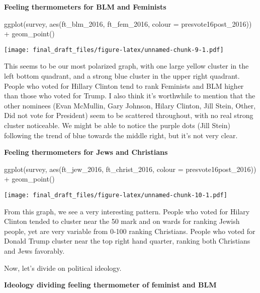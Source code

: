 \documentclass[
]{article}
\newenvironment{Shaded}{\begin{snugshade}}{\end{snugshade}}
\newcommand{\AttributeTok}[1]{\textcolor[rgb]{0.77,0.63,0.00}{#1}}
\newcommand{\FunctionTok}[1]{\textcolor[rgb]{0.00,0.00,0.00}{#1}}
\newcommand{\NormalTok}[1]{#1}
\newcommand{\SpecialCharTok}[1]{\textcolor[rgb]{0.00,0.00,0.00}{#1}}
\begin{document}
\textbf{Feeling thermometers for BLM and Feminists}

\begin{Shaded}
\begin{Highlighting}[]
\FunctionTok{ggplot}\NormalTok{(survey, }\FunctionTok{aes}\NormalTok{(ft\_blm\_2016, ft\_fem\_2016, }\AttributeTok{colour =}\NormalTok{ presvote16post\_2016)) }\SpecialCharTok{+} 
  \FunctionTok{geom\_point}\NormalTok{()}
\end{Highlighting}
\end{Shaded}

\texttt{[image: final\_draft\_files/figure-latex/unnamed-chunk-9-1.pdf]}

This seems to be our most polarized graph, with one large yellow cluster
in the left bottom quadrant, and a strong blue cluster in the upper
right quadrant. People who voted for Hillary Clinton tend to rank
Feminists and BLM higher than those who voted for Trump. I also think
it's worthwhile to mention that the other nominees (Evan McMullin, Gary
Johnson, Hilary Clinton, Jill Stein, Other, Did not vote for President)
seem to be scattered throughout, with no real strong cluster noticeable.
We might be able to notice the purple dots (Jill Stein) following the
trend of blue towards the middle right, but it's not very clear.

\textbf{Feeling thermometers for Jews and Christians}

\begin{Shaded}
\begin{Highlighting}[]
\FunctionTok{ggplot}\NormalTok{(survey, }\FunctionTok{aes}\NormalTok{(ft\_jew\_2016, ft\_christ\_2016, }\AttributeTok{colour =}\NormalTok{ presvote16post\_2016)) }\SpecialCharTok{+} 
  \FunctionTok{geom\_point}\NormalTok{()}
\end{Highlighting}
\end{Shaded}

\texttt{[image: final\_draft\_files/figure-latex/unnamed-chunk-10-1.pdf]}

From this graph, we see a very interesting pattern. People who voted for
Hilary Clinton tended to cluster near the 50 mark and on wards for
ranking Jewish people, yet are very variable from 0-100 ranking
Christians. People who voted for Donald Trump cluster near the top right
hand quarter, ranking both Christians and Jews favorably.

Now, let's divide on political ideology.

\textbf{Ideology dividing feeling thermometer of feminist and BLM}
\end{document}
